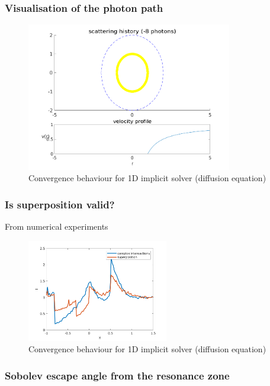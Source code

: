 \documentclass[../main/main.tex]{subfiles}
\begin{document}
\subsubsection{Visualisation of the photon path}

\begin{figure}[!htp]
\centering
\includegraphics[width=0.8\textwidth]{../../two_resonance_lines/figures/photon_path.png}
\caption{Convergence behaviour for 1D implicit solver (diffusion equation)}
\label{1D_implicit_diffusion}
\end{figure}

\subsubsection{Is superposition valid?}
From numerical experiments

\begin{figure}[!htp]
\centering
\includegraphics[width=0.55\textwidth]{../../two_resonance_lines/figures/superposition_test.png}
\caption{Convergence behaviour for 1D implicit solver (diffusion equation)}
\label{1D_implicit_diffusion}
\end{figure}


\subsubsection{Sobolev escape angle from the resonance zone}
\end{document}
